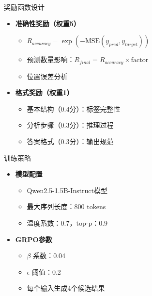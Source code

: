 \begin{frame}{奖励函数设计}
    \begin{itemize}
        \item \textbf{准确性奖励（权重5）}
        \begin{itemize}
            \item $R_{accuracy} = \exp(-\text{MSE}(y_{pred}, y_{target}))$
            \item 预测数量影响：$R_{final} = R_{accuracy} \times \text{factor}$
            \item 位置误差分析
        \end{itemize}
        \vspace{0.2cm}
        \item \textbf{格式奖励（权重1）}
        \begin{itemize}
            \item 基本结构（0.4分）：标签完整性
            \item 分析步骤（0.3分）：推理过程
            \item 答案格式（0.3分）：输出规范
        \end{itemize}
    \end{itemize}
\end{frame}

\begin{frame}{训练策略}
    \begin{itemize}
        \item \textbf{模型配置}
        \begin{itemize}
            \item Qwen2.5-1.5B-Instruct模型
            \item 最大序列长度：800 tokens
            \item 温度系数：0.7，top-p：0.9
        \end{itemize}
        \vspace{0.2cm}
        \item \textbf{GRPO参数}
        \begin{itemize}
            \item $\beta$ 系数：0.04
            \item $\epsilon$ 阈值：0.2
            \item 每个输入生成4个候选结果
        \end{itemize}
    \end{itemize}
\end{frame}